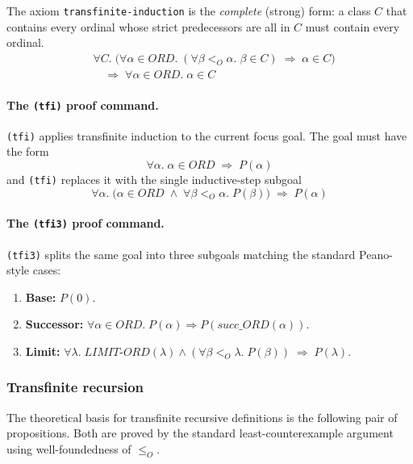 \documentclass{amsbook}[openany]
\theoremstyle{definition}
\theoremstyle{remark}
\theoremstyle{remark}
\begin{document}
The axiom \texttt{transfinite-induction} is the \emph{complete} (strong)
form: a class $C$ that contains every ordinal whose strict predecessors are
all in $C$ must contain every ordinal.
\begin{align*}
  &\forall C.\;
    \bigl(\forall\alpha \in \mathit{ORD}.\;
      (\forall \beta <_O \alpha.\; \beta \in C) \;\Rightarrow\; \alpha \in C\bigr) \\
  &\quad\Rightarrow\;
    \forall\alpha \in \mathit{ORD}.\; \alpha \in C
\end{align*}

\paragraph{The \texttt{(tfi)} proof command.}

\texttt{(tfi)} applies transfinite induction to the current focus goal.
The goal must have the form
\[
  \forall \alpha.\; \alpha \in \mathit{ORD} \;\Rightarrow\; P(\alpha)
\]
and \texttt{(tfi)} replaces it with the single inductive-step subgoal
\[
  \forall \alpha.\;
    \bigl(\alpha \in \mathit{ORD} \;\land\;
          \forall\beta <_O \alpha.\; P(\beta)\bigr)
    \;\Rightarrow\; P(\alpha)
\]

\paragraph{The \texttt{(tfi3)} proof command.}

\texttt{(tfi3)} splits the same goal into three subgoals matching the
standard Peano-style cases:
\begin{enumerate}
\item \textbf{Base:} $P(0)$.
\item \textbf{Successor:} $\forall\alpha \in \mathit{ORD}.\; P(\alpha) \Rightarrow P(\mathit{succ\_ORD}(\alpha))$.
\item \textbf{Limit:} $\forall\lambda.\;
  \mathit{LIMIT\text{-}ORD}(\lambda) \land
  (\forall\beta <_O \lambda.\; P(\beta)) \;\Rightarrow\; P(\lambda)$.
\end{enumerate}

\subsubsection{Transfinite recursion}
\label{sec:ord-recursion}

The theoretical basis for transfinite recursive definitions is the
following pair of propositions.  Both are proved by the standard
least-counterexample argument using well-foundedness of $\leq_O$.
\end{document}
